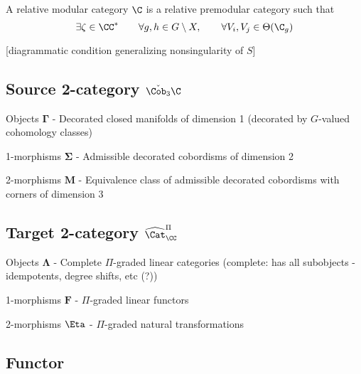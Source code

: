 \begin{definition}
A relative modular category $\C$ is a relative premodular category such that  
$$\exists \zeta \in \CC^* \qquad \forall g,h \in G \setminus X, 
\qquad \forall V_i, V_j \in \Theta(\C_g)$$

[diagrammatic condition generalizing nonsingularity of $S$]
\end{definition}

\subsection{Source 2-category $\check{\Cob_3} \C$}

Objects $\mathbf{\Gamma}$ - Decorated closed manifolds of dimension 1 (decorated by $G$-valued cohomology classes)

1-morphisms $\mathbf{\Sigma}$ - Admissible decorated cobordisms of dimension 2

2-morphisms $\mathbf{M}$ - Equivalence class of admissible decorated cobordisms with corners of dimension 3

\subsection{Target 2-category $\widehat{\Cat}^\Pi_\CC$}

Objects $\mathbf{\Lambda}$ - Complete $\Pi$-graded linear categories (complete: has all subobjects - idempotents, degree shifts, etc (?))

1-morphisms $\mathbf{F}$ - $\Pi$-graded linear functors

2-morphisms $\mathbf{\Eta}$ - $\Pi$-graded natural transformations


\subsection{Functor}


